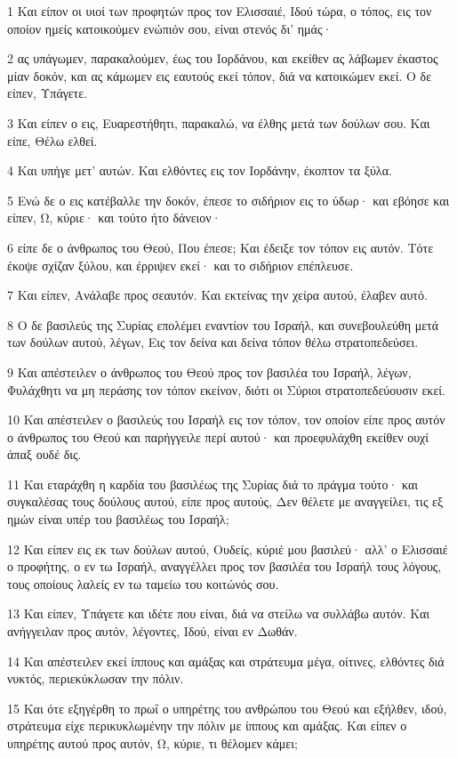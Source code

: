 \par 1 Και είπον οι υιοί των προφητών προς τον Ελισσαιέ, Ιδού τώρα, ο τόπος, εις τον οποίον ημείς κατοικούμεν ενώπιόν σου, είναι στενός δι' ημάς·
\par 2 ας υπάγωμεν, παρακαλούμεν, έως του Ιορδάνου, και εκείθεν ας λάβωμεν έκαστος μίαν δοκόν, και ας κάμωμεν εις εαυτούς εκεί τόπον, διά να κατοικώμεν εκεί. Ο δε είπεν, Υπάγετε.
\par 3 Και είπεν ο εις, Ευαρεστήθητι, παρακαλώ, να έλθης μετά των δούλων σου. Και είπε, Θέλω ελθεί.
\par 4 Και υπήγε μετ' αυτών. Και ελθόντες εις τον Ιορδάνην, έκοπτον τα ξύλα.
\par 5 Ενώ δε ο εις κατέβαλλε την δοκόν, έπεσε το σιδήριον εις το ύδωρ· και εβόησε και είπεν, Ω, κύριε· και τούτο ήτο δάνειον·
\par 6 είπε δε ο άνθρωπος του Θεού, Που έπεσε; Και έδειξε τον τόπον εις αυτόν. Τότε έκοψε σχίζαν ξύλου, και έρριψεν εκεί· και το σιδήριον επέπλευσε.
\par 7 Και είπεν, Ανάλαβε προς σεαυτόν. Και εκτείνας την χείρα αυτού, έλαβεν αυτό.
\par 8 Ο δε βασιλεύς της Συρίας επολέμει εναντίον του Ισραήλ, και συνεβουλεύθη μετά των δούλων αυτού, λέγων, Εις τον δείνα και δείνα τόπον θέλω στρατοπεδεύσει.
\par 9 Και απέστειλεν ο άνθρωπος του Θεού προς τον βασιλέα του Ισραήλ, λέγων, Φυλάχθητι να μη περάσης τον τόπον εκείνον, διότι οι Σύριοι στρατοπεδεύουσιν εκεί.
\par 10 Και απέστειλεν ο βασιλεύς του Ισραήλ εις τον τόπον, τον οποίον είπε προς αυτόν ο άνθρωπος του Θεού και παρήγγειλε περί αυτού· και προεφυλάχθη εκείθεν ουχί άπαξ ουδέ δις.
\par 11 Και εταράχθη η καρδία του βασιλέως της Συρίας διά το πράγμα τούτο· και συγκαλέσας τους δούλους αυτού, είπε προς αυτούς, Δεν θέλετε με αναγγείλει, τις εξ ημών είναι υπέρ του βασιλέως του Ισραήλ;
\par 12 Και είπεν εις εκ των δούλων αυτού, Ουδείς, κύριέ μου βασιλεύ· αλλ' ο Ελισσαιέ ο προφήτης, ο εν τω Ισραήλ, αναγγέλλει προς τον βασιλέα του Ισραήλ τους λόγους, τους οποίους λαλείς εν τω ταμείω του κοιτώνός σου.
\par 13 Και είπεν, Υπάγετε και ιδέτε που είναι, διά να στείλω να συλλάβω αυτόν. Και ανήγγειλαν προς αυτόν, λέγοντες, Ιδού, είναι εν Δωθάν.
\par 14 Και απέστειλεν εκεί ίππους και αμάξας και στράτευμα μέγα, οίτινες, ελθόντες διά νυκτός, περιεκύκλωσαν την πόλιν.
\par 15 Και ότε εξηγέρθη το πρωΐ ο υπηρέτης του ανθρώπου του Θεού και εξήλθεν, ιδού, στράτευμα είχε περικυκλωμένην την πόλιν με ίππους και αμάξας. Και είπεν ο υπηρέτης αυτού προς αυτόν, Ω, κύριε, τι θέλομεν κάμει;
